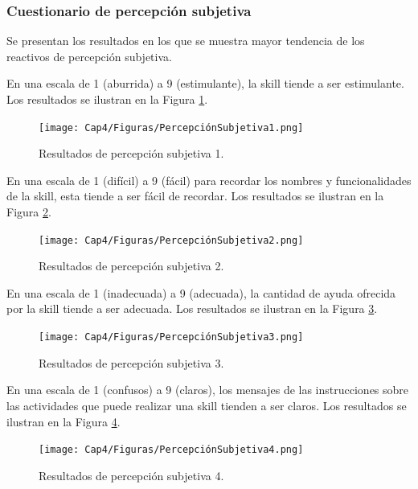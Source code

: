 
\subsubsection{Cuestionario de percepción subjetiva}
\label{CuestionarioPercepcionSubjetivacapIV}

Se presentan los resultados en los que se muestra mayor tendencia de los reactivos de percepción subjetiva.

En una escala de 1 (aburrida) a 9 (estimulante), la skill tiende a ser estimulante. Los resultados se ilustran en la Figura \ref{fig:426}.

\begin{figure}[H]
  \centering
  \texttt{[image: Cap4/Figuras/PercepciónSubjetiva1.png]}
  \caption{Resultados de percepción subjetiva 1.}
  \label{fig:426}
\end{figure}

En una escala de 1 (difícil) a 9 (fácil) para recordar los nombres y funcionalidades de la skill, esta tiende a ser fácil de recordar. Los resultados se ilustran en la Figura \ref{fig:427}.

\begin{figure}[H]
  \centering
  \texttt{[image: Cap4/Figuras/PercepciónSubjetiva2.png]}
  \caption{Resultados de percepción subjetiva 2.}
  \label{fig:427}
\end{figure}

En una escala de 1 (inadecuada) a 9 (adecuada), la cantidad de ayuda ofrecida por la skill tiende a ser adecuada. Los resultados se ilustran en la Figura \ref{fig:428}.

\begin{figure}[H]
  \centering
  \texttt{[image: Cap4/Figuras/PercepciónSubjetiva3.png]}
  \caption{Resultados de percepción subjetiva 3.}
  \label{fig:428}
\end{figure}

En una escala de 1 (confusos) a 9 (claros), los mensajes de las instrucciones sobre las actividades que puede realizar una skill tienden a ser claros. Los resultados se ilustran en la Figura \ref{fig:429}.

\begin{figure}[H]
  \centering
  \texttt{[image: Cap4/Figuras/PercepciónSubjetiva4.png]}
  \caption{Resultados de percepción subjetiva 4.}
  \label{fig:429}
\end{figure}

